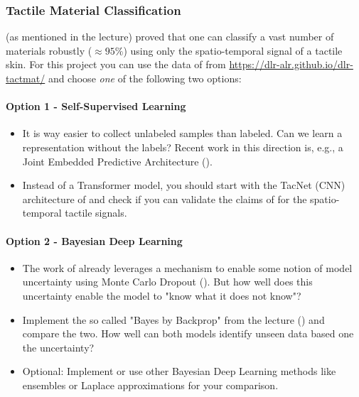 \documentclass[a4paper]{article}
\begin{document}
\subsubsection{Tactile Material Classification}

\citet{Tulbure2018} (as mentioned in the lecture) proved that one can classify a vast number of materials robustly ($\approx 95 \%$) using only the spatio-temporal signal of a tactile skin.
For this project you can use the data of \citet{Tulbure2018} from \url{https://dlr-alr.github.io/dlr-tactmat/} and choose \emph{one} of the following two options: 

\paragraph{Option 1 - Self-Supervised Learning}
\begin{itemize}
  \item It is way easier to collect unlabeled samples than labeled. Can we learn a representation without the labels? Recent work in this direction is, e.g., a Joint Embedded Predictive Architecture (\citet{assran2023selfsupervised}).
  \item Instead of a Transformer model, you should start with the TacNet (CNN) architecture of \citet{Tulbure2018} and check if you can validate the claims of \citet{assran2023selfsupervised} for the spatio-temporal tactile signals. 
\end{itemize}

\paragraph{Option 2 - Bayesian Deep Learning}
\begin{itemize}
  \item The work of \citet{Tulbure2018} already leverages a mechanism to enable some notion of model uncertainty using Monte Carlo Dropout (\citet{Gal2016}). But how well does this uncertainty enable the model to "know what it does not know"?
  \item Implement the so called "Bayes by Backprop" from the lecture (\citet{Blundell2015}) and compare the two. How well can both models identify unseen data based one the uncertainty? 
  \item Optional: Implement or use other Bayesian Deep Learning methods like ensembles or Laplace approximations for your comparison.
\end{itemize}
\end{document}
